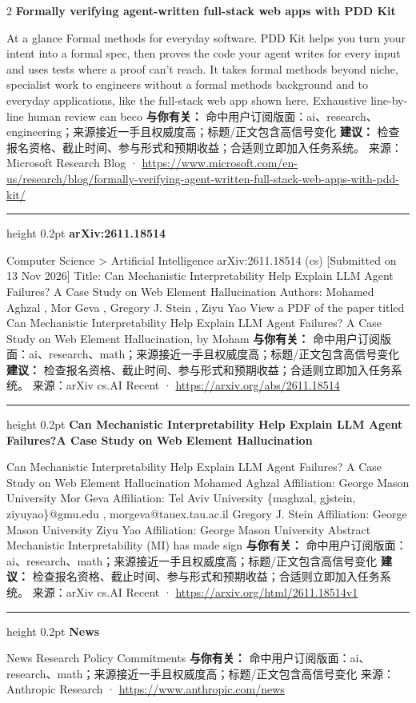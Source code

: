 \documentclass[10.5pt]{ctexart}
\begin{document}
\begin{multicols}{2}
{\large\bfseries Formally verifying agent-written full-stack web apps with PDD Kit}\par
At a glance Formal methods for everyday software. PDD Kit helps you turn your intent into a formal spec, then proves the code your agent writes for every input and uses tests where a proof can’t reach. It takes formal methods beyond niche, specialist work to engineers without a formal methods background and to everyday applications, like the full-stack web app shown here. Exhaustive line-by-line human review can beco
\textbf{与你有关：} 命中用户订阅版面：ai、research、engineering；来源接近一手且权威度高；标题/正文包含高信号变化
\textbf{建议：} 检查报名资格、截止时间、参与形式和预期收益；合适则立即加入任务系统。
{\footnotesize\color{ormuted} 来源：Microsoft Research Blog · \url{https://www.microsoft.com/en-us/research/blog/formally-verifying-agent-written-full-stack-web-apps-with-pdd-kit/}}
\vspace{2mm}
\hrule height 0.2pt
\vspace{2mm}
{\large\bfseries arXiv:2611.18514}\par
Computer Science > Artificial Intelligence arXiv:2611.18514 (cs) [Submitted on 13 Nov 2026] Title: Can Mechanistic Interpretability Help Explain LLM Agent Failures? A Case Study on Web Element Hallucination Authors: Mohamed Aghzal , Mor Geva , Gregory J. Stein , Ziyu Yao View a PDF of the paper titled Can Mechanistic Interpretability Help Explain LLM Agent Failures? A Case Study on Web Element Hallucination, by Moham
\textbf{与你有关：} 命中用户订阅版面：ai、research、math；来源接近一手且权威度高；标题/正文包含高信号变化
\textbf{建议：} 检查报名资格、截止时间、参与形式和预期收益；合适则立即加入任务系统。
{\footnotesize\color{ormuted} 来源：arXiv cs.AI Recent · \url{https://arxiv.org/abs/2611.18514}}
\vspace{2mm}
\hrule height 0.2pt
\vspace{2mm}
{\large\bfseries Can Mechanistic Interpretability Help Explain LLM Agent Failures?A Case Study on Web Element Hallucination}\par
Can Mechanistic Interpretability Help Explain LLM Agent Failures? A Case Study on Web Element Hallucination Mohamed Aghzal Affiliation: George Mason University Mor Geva Affiliation: Tel Aviv University \{maghzal, gjstein, ziyuyao\}@gmu.edu , morgeva@tauex.tau.ac.il Gregory J. Stein Affiliation: George Mason University Ziyu Yao Affiliation: George Mason University Abstract Mechanistic Interpretability (MI) has made sign
\textbf{与你有关：} 命中用户订阅版面：ai、research、math；来源接近一手且权威度高；标题/正文包含高信号变化
\textbf{建议：} 检查报名资格、截止时间、参与形式和预期收益；合适则立即加入任务系统。
{\footnotesize\color{ormuted} 来源：arXiv cs.AI Recent · \url{https://arxiv.org/html/2611.18514v1}}
\vspace{2mm}
\hrule height 0.2pt
\vspace{2mm}
{\large\bfseries News}\par
News Research Policy Commitments
\textbf{与你有关：} 命中用户订阅版面：ai、research、math；来源接近一手且权威度高；标题/正文包含高信号变化
{\footnotesize\color{ormuted} 来源：Anthropic Research · \url{https://www.anthropic.com/news}}
\end{multicols}
\end{document}
